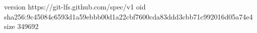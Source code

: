 version https://git-lfs.github.com/spec/v1
oid sha256:9c45084c6593d1a59ebbb00d1a22cbf7600cda83ddd3cbb71c992016d05a74e4
size 349692
